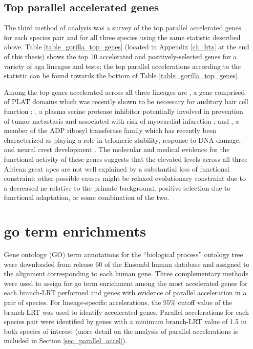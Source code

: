 \subsection{Top parallel accelerated genes}

The third method of analysis was a survey of the top parallel
accelerated genes for each species pair and for all three species
using the same \lrtmin statistic described above. Table
\ref{table_gorilla_top_genes} (located in Appendix \ref{ch_lrts} at
the end of this thesis) shows the top 10 accelerated and
positively-selected genes for a variety of \ac{aga} lineages and
tests; the top parallel accelerations according to the \lrtmin
statistic can be found towards the bottom of Table
\ref{table_gorilla_top_genes}.

Among the top genes accelerated across all three lineages are
, a gene comprised of PLAT domains which was recently
shown to be necessary for auditory hair cell function
\citep{Edvardson2011}; , a plasma serine protease
inhibitor potentially involved in prevention of tumor metastasis and
associated with risk of myocardial infarction \citep{Ebana2007}; and
, a member of the ADP ribosyl transferase family which has
recently been characterized as playing a role in telomeric stability,
response to DNA damage, and neural crest development
\citep{Rouleau2011,Boehler2011}. The molecular and medical evidence
for the functional activity of these genes suggests that the elevated
\dnds levels across all three African great apes are not well
explained by a substantial loss of functional constraint; other
possible causes might be relaxed evolutionary constraint due to a
decreased \ac{ne} relative to the primate
background, positive selection due to functional adaptation, or some
combination of the two. 

\section{\acf{go} term enrichments}
\label{sec_gorilla_go}

Gene ontology (GO) term annotations for the ``biological process''
ontology tree were downloaded from release 60 of the Ensembl human
database \citep{Flicek2011} and assigned to the alignment
corresponding to each human gene. Three complementary methods were
used to assign \pvs for \ac{go} term enrichment among the most
accelerated genes for each branch-LRT performed and genes with
evidence of parallel acceleration in a pair of species. For
lineage-specific accelerations, the 95\% \chisq cutoff value of the
branch-LRT was used to identify accelerated genes. Parallel
accelerations for each species pair were identified by genes with a
minimum branch-LRT value of 1.5 in both species of interest (more
detail on the analysis of parallel accelerations is included in
Section \ref{sec_parallel_accel}).

